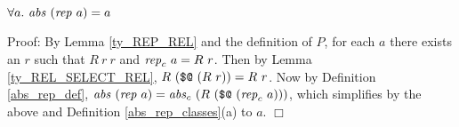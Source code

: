 \documentclass[envcountsame,runningheads]{llncs}
\begin{document}
\begin{theorem}
\label{ty_ABS_REP}
$\forall a.\ {\it abs}\ ({\it rep}\ a) = a$
\end{theorem}
Proof:
By Lemma \ref{ty_REP_REL}
 and the definition of $P$,
for each $a$
there exists an $r$ such that
$R\ r\ r$ and ${\it rep}_c\ a = R\ r$.
Then
by Lemma \ref{ty_REL_SELECT_REL}, $R\ (\mbox{\tt \$@} \ (R\ r)) = R\ r$.
Now by Definition \ref{abs_rep_def}, ${\it abs}\ ({\it rep}\ a) =
{\it abs}_c\ (R\ (\mbox{\tt \$@}\ ({\it rep}_c\ a)))$,
which simplifies by the above and Definition \ref{abs_rep_classes}(a)
to $a$. $\Box$
\begin{comment}
$$
\begin{array}{rcl@{\hspace{2.0cm}}r}
{\it abs}\ ({\it rep}\ a)
& \ = \ &
{\it abs}_c\ (R\ (\mbox{\tt \$@}\ ({\it rep}_c\ a)))
& \mbox{Definition \ref{abs_rep_def}}  \\
& \ = \ &
{\it abs}_c\ (R\ (\mbox{\tt \$@}\ (R\ r)))
& \mbox{selection of $r$}  \\
& \ = \ &
{\it abs}_c\ (R\ r)
& \mbox{Lemma \ref{ty_REL_SELECT_REL} and $R\ r\ r$}  \\
& \ = \ &
{\it abs}_c\ ({\it rep}_c\ a)
\ = \ a
& \mbox{selection of $r$,} \
  \mbox{Definition \ref{abs_rep_classes}(a)}  \\
\Box \hfill & & &
\end{array}
$$
\end{comment}
\end{document}
